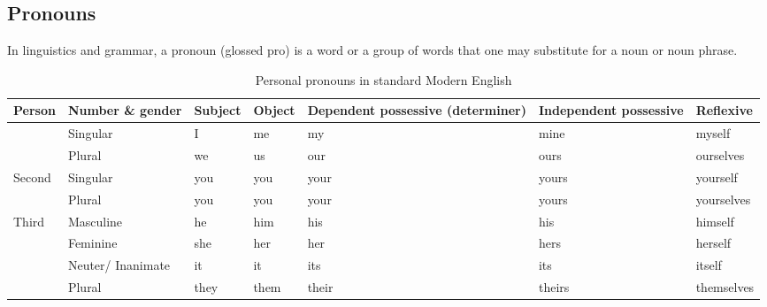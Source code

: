 \subsection{Pronouns \cite{wiki-pronoun}}
In linguistics and grammar, a pronoun (glossed pro) is a word or a group of words that one may substitute for a noun or noun phrase.

\begin{longtable}{|l|m{1.7cm}|l|l|m{2.2cm}|m{2.2cm}|l|}
    \caption{Personal pronouns in standard Modern English} \\
    \hline
    \textbf{Person} & \textbf{Number \& gender} & \textbf{Subject} & \textbf{Object} & \textbf{Dependent possessive (determiner)} & \textbf{Independent possessive} & \textbf{Reflexive} \\
    \hline
    \endfirsthead
    
    \hline
    \endhead
    
    \hline
    \endfoot
    
    \hline
    \endlastfoot

    \hline
    
    \multirow{2}{*}{First} & Singular & I & me & my & mine & myself \\ \cline{2-7}
    & Plural & we & us & our & ours & ourselves \\ \hline

    \multirow{2}{*}{Second} & Singular & you & you & your & yours & yourself \\ \cline{2-7}
    & Plural & you & you & your & yours & yourselves \\ \hline

    \multirow{4}{*}{Third} & Masculine & he & him & his & his & himself \\ \cline{2-7}
    & Feminine & she & her & her & hers & herself \\ \cline{2-7}
    & Neuter/ Inanimate & it & it & its & its & itself \\ \cline{2-7}
    & Plural & they & them & their & theirs & themselves \\ \hline


\end{longtable}

